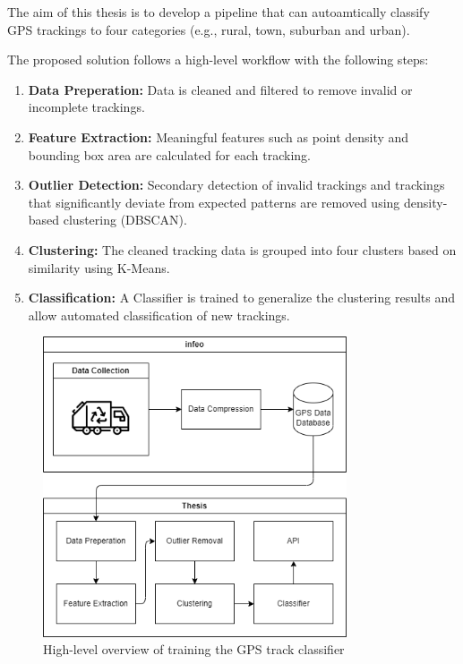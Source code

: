 \documentclass[a4paper,12pt,twoside]{scrreprt}
\begin{document}
The aim of this thesis is to develop a pipeline that can autoamtically classify
GPS trackings to four categories (e.g., rural, town, suburban and urban).

The proposed solution follows a high-level workflow with the following steps:

\begin{enumerate}
  \item \textbf{Data Preperation:} Data is cleaned and filtered to remove
        invalid or incomplete trackings.
  \item \textbf{Feature Extraction:} Meaningful features such as point density
        and bounding box area are calculated for each tracking.
  \item \textbf{Outlier Detection:} Secondary detection of invalid trackings
        and trackings that significantly deviate from expected patterns are
        removed
        using density-based clustering (DBSCAN).
  \item \textbf{Clustering:} The cleaned tracking data is grouped into four
        clusters based on similarity using K-Means.
  \item \textbf{Classification:} A Classifier is trained to generalize the
        clustering results and allow automated classification of new trackings.
\end{enumerate}

\begin{figure}[htbp]
  \centering

  \includegraphics[width=0.8\textwidth]{Diagrams/drawio/big_picture.png}
  \caption{High-level overview of training the GPS track classifier}
  \label{fig:big_picture_diagram}
\end{figure}
\FloatBarrier
\end{document}
